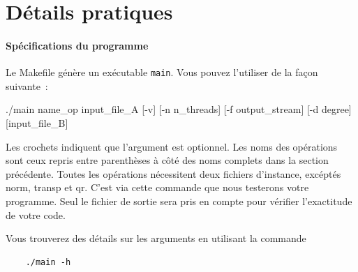 \documentclass[a4paper, 12pt]{article}
\begin{document}
\section{Détails pratiques}
\paragraph{Spécifications du programme}
Le Makefile génère un exécutable \texttt{main}. Vous pouvez l'utiliser de la façon suivante~:
\begin{spverbatim}
./main name_op input_file_A [-v] [-n n_threads] [-f output_stream] 
                                            [-d degree] [input_file_B]
\end{spverbatim}
\noindent Les crochets indiquent que l'argument est optionnel. Les noms des opérations sont ceux repris entre parenthèses à côté des noms complets dans la section précédente. Toutes les opérations nécessitent deux fichiers d'instance, excéptés norm, transp et qr. C'est via cette commande que nous testerons votre programme. Seul le fichier de sortie sera pris en compte pour vérifier l'exactitude de votre code.

\noindent Vous trouverez des détails sur les arguments en utilisant la commande
\begin{verbatim}
    ./main -h
\end{verbatim}
\end{document}
